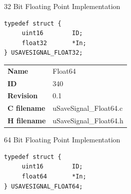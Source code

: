32 Bit Floating Point Implementation

\begin{lstlisting}
typedef struct {
     uint16        ID;
     float32       *In;
} USAVESIGNAL_FLOAT32;
\end{lstlisting}

\ifdefined \AddTestReports
{}
\fi
{}
\nopagebreak[0]
\begin{tabular}{l l}
\textbf{Name} & Float64 \tabularnewline
\textbf{ID} & 340 \tabularnewline
\textbf{Revision} & 0.1 \tabularnewline
\textbf{C filename} & uSaveSignal\_Float64.c \tabularnewline
\textbf{H filename} & uSaveSignal\_Float64.h \tabularnewline
\end{tabular}
\vspace{1ex}

64 Bit Floating Point Implementation

\begin{lstlisting}
typedef struct {
     uint16        ID;
     float64       *In;
} USAVESIGNAL_FLOAT64;
\end{lstlisting}

\ifdefined \AddTestReports
{}
\fi
